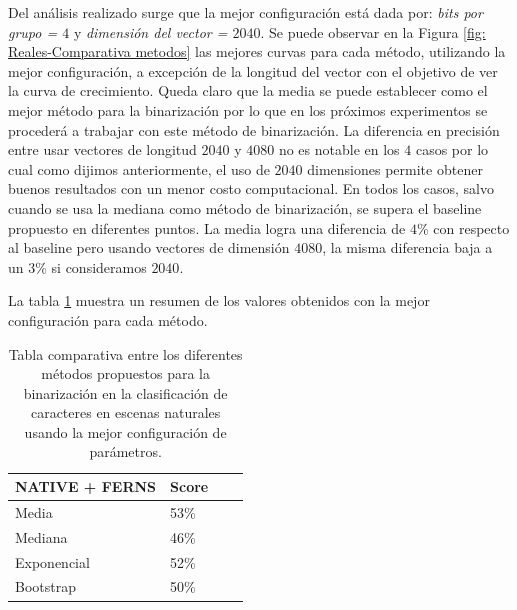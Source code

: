 	Del análisis realizado surge que la mejor configuración está dada por: \textit{bits por grupo = $4$} y \textit{dimensión del vector = $2040$}. Se puede observar en la Figura \ref{fig: Reales-Comparativa metodos} las mejores curvas para cada método, utilizando la mejor configuración, a excepción de la longitud del vector con el objetivo de ver la curva de crecimiento. Queda claro que la media se puede establecer como el mejor método para la binarización por lo que en los próximos experimentos se procederá a trabajar con este método de binarización. La diferencia en precisión entre usar vectores de longitud $2040$ y $4080$ no es notable en los $4$ casos por lo cual como dijimos anteriormente, el uso de $2040$ dimensiones permite obtener buenos resultados con un menor costo computacional. En todos los casos, salvo cuando se usa la mediana como método de binarización, se supera el baseline propuesto en diferentes puntos. La media logra una diferencia de $4\%$ con respecto al baseline pero usando vectores de dimensión $4080$, la misma diferencia baja a un $3\%$ si consideramos $2040$.

	La tabla \ref{table: reales-comparativa} muestra un resumen de los valores obtenidos con la mejor configuración para cada método.

	\begin{table}
		\centering
		\begin{tabular}{ | l | l | l | p{5cm} |}
    			\hline
    				\textbf{NATIVE + FERNS} & \textbf{Score} \\ \hline
    				Media & 53\% \\ \hline
    				Mediana & 46\%\\ \hline
    				Exponencial & 52\% \\ \hline
    				Bootstrap & 50\%\\
    			\hline
    		\end{tabular}
    		\caption[Resultados imágenes naturales]{Tabla comparativa entre los diferentes métodos propuestos para la binarización en la clasificación de caracteres en escenas naturales usando la mejor configuración de parámetros.}
    		\label{table: reales-comparativa}
    	\end{table}





	